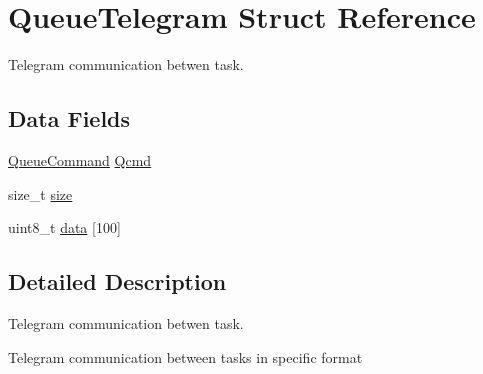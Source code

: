 \hypertarget{struct_queue_telegram}{\section{Queue\+Telegram Struct Reference}
\label{struct_queue_telegram}
}


Telegram communication betwen task.  


\subsection*{Data Fields}
\begin{DoxyCompactItemize}
\item 
\hyperlink{main_8h_a87d564e7bd6c8ad9e1088c17ba0f91f4}{Queue\+Command} \hyperlink{struct_queue_telegram_a752eb6858a0e18355371dc6cdc559e64}{Qcmd}
\item 
size\+\_\+t \hyperlink{struct_queue_telegram_a5adaf2ba7c2db4f8f198143783d09db3}{size}
\item 
uint8\+\_\+t \hyperlink{struct_queue_telegram_a7e29925d18b381b18d7987672ed5a3f9}{data} \mbox{[}100\mbox{]}
\end{DoxyCompactItemize}


\subsection{Detailed Description}
Telegram communication betwen task. 

Telegram communication between tasks in specific format 

